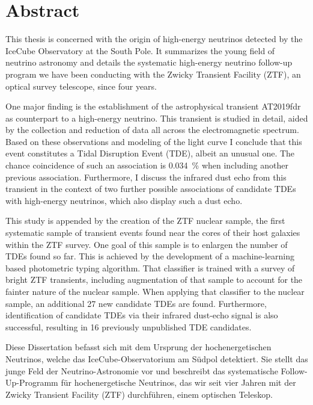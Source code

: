 \chapter*{Abstract}\label{abstract}


This thesis is concerned with the origin of high-energy neutrinos detected by the IceCube Observatory at the South Pole. It summarizes the young field of neutrino astronomy and details the systematic high-energy neutrino follow-up program we have been conducting with the Zwicky Transient Facility (ZTF), an optical survey telescope, since four years.

One major finding is the establishment of the astrophysical transient AT2019fdr as counterpart to a high-energy neutrino. This transient is studied in detail, aided by the collection and reduction of data all across the electromagnetic spectrum. Based on these observations and modeling of the light curve I conclude that this event constitutes a Tidal Disruption Event (TDE), albeit an unusual one. The chance coincidence of such an association is \SI{0.034}{\percent} when including another previous association. Furthermore, I discuss the infrared dust echo from this transient in the context of two further possible associations of candidate TDEs with high-energy neutrinos, which also display such a dust echo.

This study is appended by the creation of the ZTF nuclear sample, the first systematic sample of transient events found near the cores of their host galaxies within the ZTF survey. One goal of this sample is to enlargen the number of TDEs found so far. This is achieved by the development of a machine-learning based photometric typing algorithm. That classifier is trained with a survey of bright ZTF transients, including augmentation of that sample to account for the fainter nature of the nuclear sample. When applying that classifier to the nuclear sample, an additional 27 new candidate TDEs are found. Furthermore, identification of candidate TDEs via their infrared dust-echo signal is also successful, resulting in 16 previously unpublished TDE candidates.

\newpage

Diese Dissertation befasst sich mit dem Ursprung der hochenergetischen Neutrinos, welche das IceCube-Observatorium am Südpol detektiert. Sie stellt das junge Feld der Neutrino-Astronomie vor und beschreibt das systematische Follow-Up-Programm für hochenergetische Neutrinos, das wir seit vier Jahren mit der Zwicky Transient Facility (ZTF) durchführen, einem optischen Teleskop.

